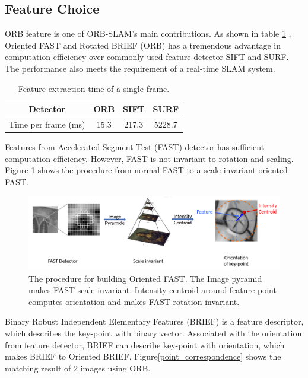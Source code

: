 \documentclass[letterpaper, 10 pt, conference]{ieeeconf}  %
\begin{document}
\subsection{Feature Choice}
ORB feature is one of ORB-SLAM's main contributions. As shown in table \ref{feature_extraction_time} \cite{ORBextract}, Oriented FAST and Rotated BRIEF (ORB) has a tremendous advantage in computation efficiency over commonly used feature detector SIFT and SURF. The performance also meets the requirement of a real-time SLAM system.
%
\begin{table}[h!]
\caption{Feature extraction time of a single frame.}
\label{feature_extraction_time}
\centering
\begin{tabular}{ c c c c } 
 \hline
 \hline
 Detector & ORB & SIFT & SURF \\ 
 \hline
 Time per frame (ms)& 15.3 & 217.3 & 5228.7\\ 
 \hline
 \hline
\end{tabular}
\end{table}
%

Features from Accelerated Segment Test (FAST) detector has sufficient computation efficiency. However, FAST is not invariant to rotation and scaling. Figure \ref{oriented_fast} shows the procedure from normal FAST to a scale-invariant oriented FAST. 
%
\begin{figure}[!htbp]%
\centering
\includegraphics[scale=0.14]{./images/Oriented_FAST}
\caption{The procedure for building Oriented FAST. The Image pyramid makes FAST scale-invariant. Intensity centroid around feature point computes orientation and makes FAST rotation-invariant.}
\label{oriented_fast}
\end{figure}
%

Binary Robust Independent Elementary Features (BRIEF) is a feature descriptor, which describes the key-point with binary vector. Associated with the orientation from feature detector, BRIEF can describe key-point with orientation, which makes BRIEF to Oriented BRIEF. Figure\ref{point_correspondence} shows the matching result of 2 images using ORB.
\end{document}
